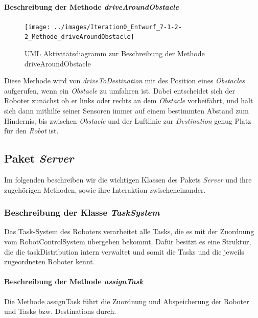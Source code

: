 {			%
			\paragraph{Beschreibung der Methode \textit{driveAroundObstacle}}
			\begin{figure}[H]
			\centering
			\texttt{[image: ../images/Iteration0\_Entwurf\_7-1-2-2\_Methode\_driveAroundObstacle]}
			\caption{UML Aktivitätsdiagramm zur Beschreibung der Methode driveAroundObstacle}
			\label{BeschreibungKlasse1}
			\end{figure}

			Diese Methode wird von \textit{driveToDestination} mit des Position eines \textit{Obstacles} aufgerufen, 
			wenn ein \textit{Obstacle} zu umfahren ist.
			Dabei entscheidet sich der Roboter zunächst ob er links oder rechts an dem \textit{Obstacle} vorbeifährt, 
			und hält sich dann mithilfe seiner Sensoren immer auf einem bestimmten Abstand zum Hindernis, bis zwischen 
			\textit{Obstacle} und der Luftlinie zur \textit{Destination} genug Platz für den \textit{Robot} ist.
	
\subsection{Paket \textit{Server}}
	Im folgenden beschreiben wir die wichtigen Klassen des Pakets \textit{Server} 
	und ihre zugehörigen Methoden, sowie ihre Interaktion zwischeneinander. 


	\subsubsection{Beschreibung der Klasse \textit{TaskSystem}}
		Das Task-System des Roboters verarbeitet alle Tasks, die es mit der Zuordnung vom RobotControlSystem übergeben bekommt. Dafür besitzt es eine Struktur, die die taskDistribution intern verwaltet und somit die Tasks und die jeweils zugeordneten Roboter kennt.
		
			\paragraph{Beschreibung der Methode \textit{assignTask}}
			Die Methode assignTask führt die Zuordnung und Abspeicherung der Roboter und Tasks bzw. Destinations durch.
			
}
